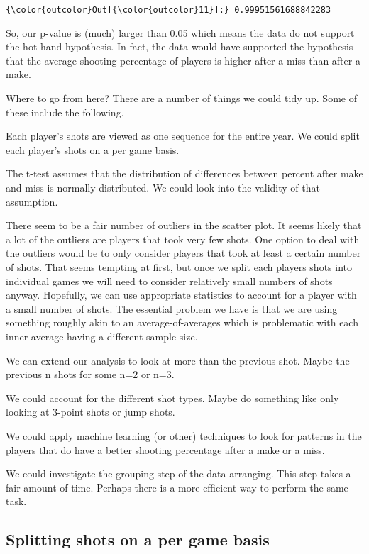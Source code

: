 \documentclass{article}
\begin{document}
            \begin{Verbatim}[commandchars=\\\{\}]
{\color{outcolor}Out[{\color{outcolor}11}]:} 0.99951561688842283
\end{Verbatim}
        
    So, our p-value is (much) larger than 0.05 which means the data do not
support the hot hand hypothesis. In fact, the data would have supported
the hypothesis that the average shooting percentage of players is higher
after a miss than after a make.

Where to go from here? There are a number of things we could tidy up.
Some of these include the following.

Each player's shots are viewed as one sequence for the entire year. We
could split each player's shots on a per game basis.

The t-test assumes that the distribution of differences between percent
after make and miss is normally distributed. We could look into the
validity of that assumption.

There seem to be a fair number of outliers in the scatter plot. It seems
likely that a lot of the outliers are players that took very few shots.
One option to deal with the outliers would be to only consider players
that took at least a certain number of shots. That seems tempting at
first, but once we split each players shots into individual games we
will need to consider relatively small numbers of shots anyway.
Hopefully, we can use appropriate statistics to account for a player
with a small number of shots. The essential problem we have is that we
are using something roughly akin to an average-of-averages which is
problematic with each inner average having a different sample size.

We can extend our analysis to look at more than the previous shot. Maybe
the previous n shots for some n=2 or n=3.

We could account for the different shot types. Maybe do something like
only looking at 3-point shots or jump shots.

We could apply machine learning (or other) techniques to look for
patterns in the players that do have a better shooting percentage after
a make or a miss.

We could investigate the grouping step of the data arranging. This step
takes a fair amount of time. Perhaps there is a more efficient way to
perform the same task.


    \subsection{Splitting shots on a per game basis}
\end{document}
